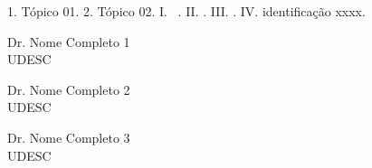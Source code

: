 \documentclass[english,brazil]{dissertacaoudesc}
\begin{document}
    \capa



    \imprimirfolhaderosto*

    \begin{fichacatalografica}
        \begin{fichacatalograficaexemplo}
            1. Tópico 01.
            2. Tópico 02.
            I. \imprimirorientadortitulo~\imprimirorientador.
            II. \imprimirinstituicao.
            III. \imprimircentro.
            IV. identificação xxxx.
        \end{fichacatalograficaexemplo}
    \end{fichacatalografica}

    \begin{folhadeaprovacao}
        \begin{folhadeaprovacaoexemplo}
            Dr. Nome Completo 1 \\ UDESC
            \vspace{2\onelineskip}

            Dr. Nome Completo 2 \\ UDESC
            \vspace{2\onelineskip}

            Dr. Nome Completo 3 \\ UDESC
        \end{folhadeaprovacaoexemplo}
    \end{folhadeaprovacao}

    
    
    
    
    \imprimirlistadefiguras
    \imprimirlistadetabelas
    
    
    \imprimirsumario



    \textual

    
    
    



    \postextual

    

    \begin{apendicesenv}
        
    \end{apendicesenv}

    \begin{anexosenv}
        
    \end{anexosenv}
\end{document}
